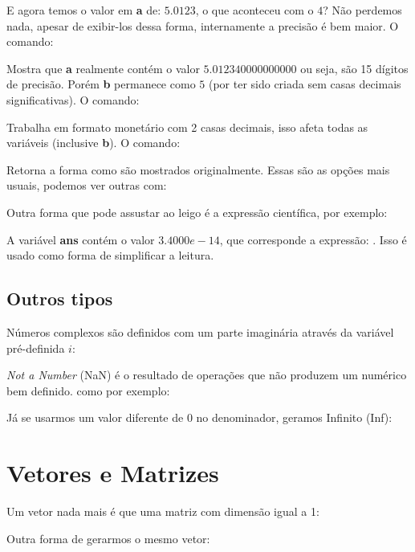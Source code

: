 \documentclass[a4paper,11pt]{article}
\begin{document}
E agora temos o valor em \textbf{a} de: $5.0123$, o que aconteceu com o $4$? Não perdemos nada, apesar de exibir-los dessa forma, internamente a precisão é bem maior. O comando: \\

Mostra que \textbf{a} realmente contém o valor $5.012340000000000$ ou seja, são 15 dígitos de precisão. Porém \textbf{b} permanece como $5$ (por ter sido criada sem casas decimais significativas). O comando: \\

Trabalha em formato monetário com 2 casas decimais, isso afeta todas as variáveis (inclusive \textbf{b}). O comando: \\

Retorna a forma como são mostrados originalmente. Essas são as opções mais usuais, podemos ver outras com: \\

Outra forma que pode assustar ao leigo é a expressão científica, por exemplo: \\

A variável \textbf{ans} contém o valor $3.4000e-14$, que corresponde a expressão: . Isso é usado como forma de simplificar a leitura.

\subsection{Outros tipos}
Números complexos são definidos com um parte imaginária através da variável pré-definida $i$: \\

\textit{Not a Number} (NaN) é o resultado de operações que não produzem um numérico bem definido. como por exemplo: \\

Já se usarmos um valor diferente de $0$ no denominador, geramos Infinito (Inf): \\

\section{Vetores e Matrizes}
Um vetor nada mais é que uma matriz com dimensão igual a 1: \\

Outra forma de gerarmos o mesmo vetor: \\
\end{document}
